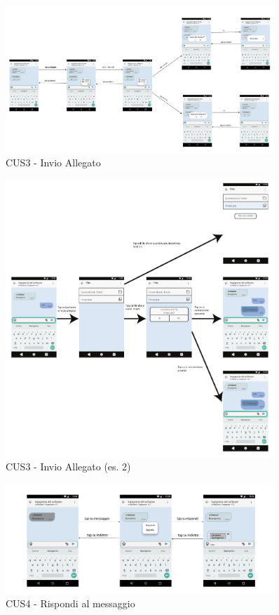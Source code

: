\begin{figure}
	\centering
	\includegraphics[width=0.9\textwidth]{imgs/gruppo6/activities/act_cus3_invia_allegato.pdf}
	\caption{CUS3 - Invio Allegato}
	\label{fig:act-cus3-1}
\end{figure}

\begin{figure}
	\centering
	\includegraphics[width=0.9\textwidth]{imgs/gruppo6/activities/act_cus3_invio_allegato2.pdf}
	\caption{CUS3 - Invio Allegato (es. 2)}
	\label{fig:act-cus3-2}
\end{figure}

\begin{figure}
	\centering
	\includegraphics[width=0.9\textwidth]{imgs/gruppo6/activities/act_cus4_rispondi_singolo_messaggio.pdf}
	\caption{CUS4 - Rispondi al messaggio}
	\label{fig:act-cus4}
\end{figure}


